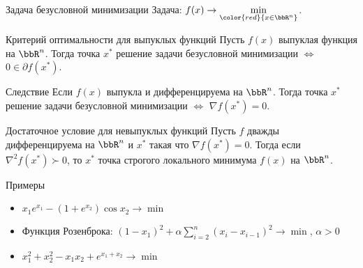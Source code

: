 \documentclass[12pt,russian]{beamer}
\begin{document}
\begin{frame}{Задача безусловной минимизации}
Задача: $f(x) \rightarrow \min\limits_{\color{red}{x \in \bbR^n}}$.

\begin{block}{Критерий оптимальности для выпуклых функций}
Пусть $f(x)$ выпуклая функция на $\bbR^n$. 
Тогда точка $x^*$ решение задачи безусловной минимизации $\Leftrightarrow$ $0 \in \partial f(x^*)$.
\end{block}

\begin{block}{Следствие}
Если $f(x)$ выпукла и дифференцируема на $\bbR^n$.
Тогда точка $x^*$ решение задачи безусловной минимизации $\Leftrightarrow$ $\nabla f(x^*) = 0$.
\end{block}

\begin{block}{Достаточное условие для невыпуклых функций}
Пусть $f$ дважды дифференцируема на $\bbR^n$ и $x^*$ такая что $\nabla f(x^*) = 0$. 
Тогда если $\nabla^2 f(x^*) \succ 0$, то $x^*$ точка строгого локального минимума $f(x)$ на $\bbR^n$.  
\end{block}

\end{frame}

\begin{frame}{Примеры}
\begin{itemize}
\item $x_1e^{x_1} - (1 + e^{x_2})\cos x_2 \rightarrow \min$
\item Функция Розенброка: $(1 - x_1)^2 + \alpha \sum\limits_{i = 2}^n (x_i - x_{i-1})^2 \rightarrow \min$, $\alpha > 0$
\item $x^2_1 + x^2_2 - x_1x_2 + e^{x_1 + x_2} \rightarrow \min$
\end{itemize}
\end{frame}
\end{document}

